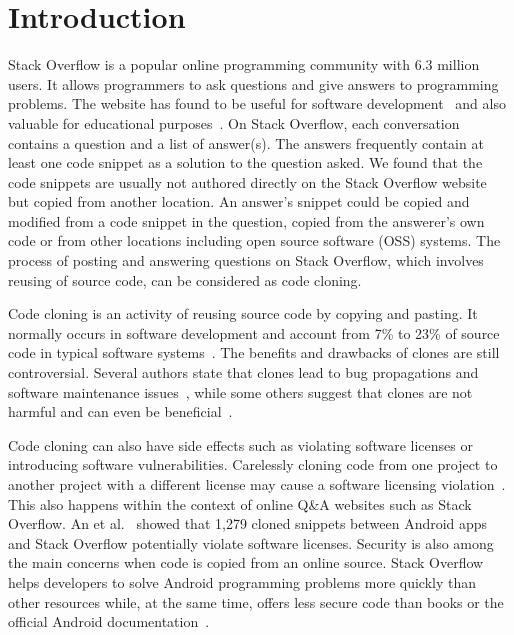 \documentclass[sigconf,review, anonymous]{acmart}
\begin{document}


	
\maketitle

\section{Introduction}

Stack Overflow is a popular online programming community with 6.3
million users. It allows programmers to ask questions and give answers
to programming problems. The website has found to be useful for
software
development~\cite{Ponzanelli2013,Ponzanelli2014,Keivanloo2014,Park2014,
  Stolee2014,Subramanian2013,Diamantopoulos2015,Treude2016} and also
valuable for educational purposes~\cite{Nasehi2012}. On Stack
Overflow, each conversation contains a question and a list of
answer(s). The answers frequently contain at least one code snippet as
a solution to the question asked. We found that the code snippets are
usually not authored directly on the Stack Overflow website but copied
from another location. An answer's snippet could be copied and modified
from a code snippet in the question, copied from the answerer's own
code or from other locations including open source software (OSS)
systems. The process of posting and answering questions on Stack
Overflow, which involves reusing of source code, can be considered as
code cloning.

Code cloning is an activity of reusing source code by copying and
pasting. It normally occurs in software development and account from
7\% to 23\% of source code in typical software
systems~\cite{Bellon2007}. The benefits and drawbacks of clones are
still controversial. Several authors state that clones lead to bug
propagations and software maintenance issues~\cite{Kamiya2002}, while
some others suggest that clones are not harmful and can even be
beneficial~\cite{Saini2016,Kapser2006}.

Code cloning can also have side effects such as violating software
licenses or introducing software vulnerabilities. Carelessly cloning
code from one project to another project with a different license may
cause a software licensing violation~\cite{German2009}. This also
happens within the context of online Q\&A websites such as Stack
Overflow. An et al.~\cite{An2017} showed that 1,279 cloned snippets
between Android apps and Stack Overflow potentially violate software
licenses. Security is also among the main concerns when code is copied
from an online source. Stack Overflow helps developers to solve
Android programming problems more quickly than other resources while,
at the same time, offers less secure code than books or the official
Android documentation~\cite{Acar2016}.
\end{document}
